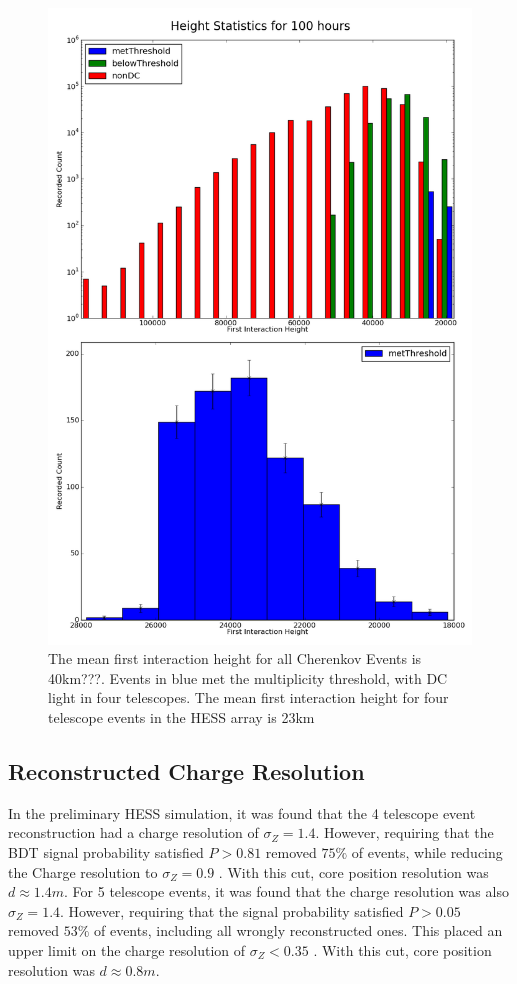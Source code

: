 \documentclass{article}
\begin{document}
\begin{figure}
\begin{center}
\includegraphics[height=0.9\textheight]{hessheight}
\caption{The mean first interaction height for all Cherenkov Events is 40km???. Events in blue met the multiplicity threshold, with DC light in four telescopes. The mean first interaction height for four telescope events in the HESS array is 23km}
\label{fig:Hessheight}
\end{center}
\end{figure}

\subsection{Reconstructed Charge Resolution}
In the preliminary HESS simulation, it was found that the 4 telescope event reconstruction had a charge resolution of $\sigma_{Z} = 1.4$. However, requiring that the BDT signal probability satisfied $P > 0.81$ removed $75 \%$ of events, while reducing the Charge resolution to $\sigma_{Z} = 0.9$ . With this cut, core position resolution was $d \approx 1.4 m $. For 5 telescope events, it was found that the charge resolution was also $\sigma_{Z} = 1.4$. However, requiring that the signal probability satisfied $P > 0.05$ removed $53 \%$ of events, including all wrongly reconstructed ones. This placed an upper limit on the charge resolution of $\sigma_{Z} < 0.35$ . With this cut, core position resolution was $d \approx 0.8 m $.
\end{document}

